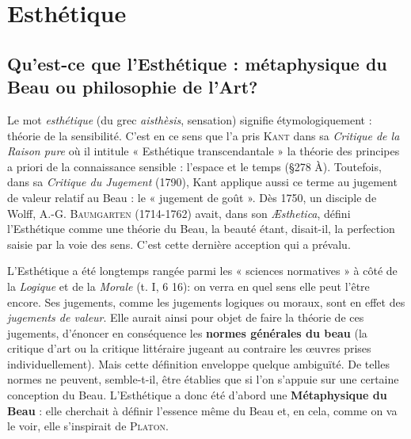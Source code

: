 
\section{Esthétique}
\subsection{Qu'est-ce que l’Esthétique : métaphysique du Beau
ou philosophie de l’Art?}
Le mot {\it esthétique} (du grec {\it aisthèsis},
sensation) signifie étymologiquement : théorie de la sensibilité. C’est
en ce sens que l’a pris \textsc{Kant} dans sa {\it Critique de la Raison pure} où il
intitule « Esthétique transcendantale » la théorie des principes a priori
de la connaissance sensible : l’espace et le temps (\S 278 À). Toutefois,
dans sa {\it Critique du Jugement} (1790), Kant applique aussi ce terme au
jugement de valeur relatif au Beau : le « jugement de goût ». Dès 1750,
un disciple de Wolff, A.-G. \textsc{Baumgarten} (1714-1762) avait, dans son
{\it Æsthetica}, défini l’Esthétique comme une théorie du Beau, la beauté
étant, disait-il, la perfection saisie par la voie des sens. C’est cette
dernière acception qui a prévalu.

L’Esthétique a été longtemps rangée parmi les « sciences normatives »
à côté de la {\it Logique} et de la {\it Morale} (t. I, 6 16): on verra en quel
sens elle peut l’être encore. Ses jugements, comme les jugements
logiques ou moraux, sont en effet des {\it jugements de valeur}. Elle aurait
ainsi pour objet de faire la théorie de ces jugements, d’énoncer en
conséquence les {\bf normes générales du beau} (la critique d’art ou la
critique littéraire jugeant au contraire les œuvres prises individuellement).
Mais cette définition enveloppe quelque ambiguïté. De telles
normes ne peuvent, semble-t-il, être établies que si l’on s’appuie sur
une certaine conception du Beau. L’Esthétique a donc été d’abord
une {\bf Métaphysique du Beau} : elle cherchait à définir l’essence même du
Beau et, en cela, comme on va le voir, elle s’inspirait de \textsc{Platon}.

